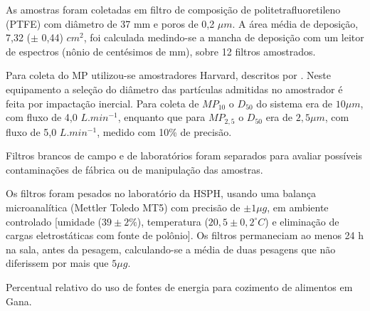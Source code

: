 As amostras foram coletadas em filtro de composição de politetrafluoretileno
(PTFE) com diâmetro de 37 mm e 
poros de 0,2 $\mu m$. A área média de deposição, 7,32 ($\pm$ 0,44) $cm^2$, 
foi calculada medindo-se a mancha de deposição com um leitor de espectros 
(nônio de centésimos de mm), sobre 12 filtros amostrados.

Para coleta do MP utilizou-se amostradores Harvard, descritos por 
\citet{marple1987}. Neste equipamento a seleção do diâmetro das partículas 
admitidas no amostrador é feita por impactação inercial. 
Para coleta de $MP_{10}$ o $D_{50}$ do sistema era de $10 \mu m$, 
com fluxo de 4,0 $L.min^{-1}$, enquanto que para $MP_{2,5}$ o $D_{50}$ 
era de $2,5 \mu m$, com fluxo de 5,0 $L.min^{-1}$, medido com 10\% de precisão. 

Filtros brancos de campo e de laboratórios foram separados para avaliar 
possíveis contaminações de fábrica ou de manipulação das amostras. 

Os filtros foram pesados no laboratório da HSPH, usando uma balança
microanalítica (Mettler Toledo MT5) com precisão de $\pm 1 \mu g$, 
em ambiente controlado [umidade ($39 \pm 2 \%$), 
temperatura ($20,5 \pm 0,2 ^{\circ} C$) e eliminação de cargas eletrostáticas 
com fonte de polônio]. Os filtros permaneciam ao menos 24 h na sala, 
antes da pesagem, calculando-se a média de duas pesagens que não diferissem 
por mais que $5 \mu g$.

\begin{table}[H]
	\centering
	
	\caption{Percentual relativo do uso de fontes de energia para cozimento 
		de alimentos em Gana. \citep{ghanacensus2013} 
		\label{table:cookfuel}}
\end{table}
